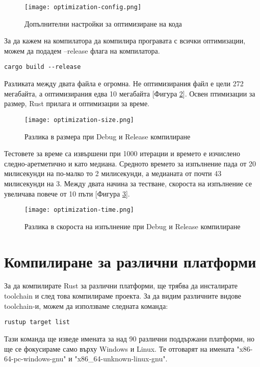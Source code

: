 \begin{figure}[!htb]
  \texttt{[image: optimization-config.png]}
  \centering
  \caption{Допълнителни настройки за оптимизиране на кода}
  \label{fig:optimization-config}
\end{figure}

За да кажем на компилатора да компилира програвата с всички оптимизации, можем
да подадем --release флага на компилатора.
\begin{lstlisting}
cargo build --release
\end{lstlisting}

Разликата между двата файла е огромна. Не оптимизирания файл е цели 272
мегабайта, а оптимизирания едва 10 мегабайта [Фигура
\ref{fig:optimization-size}]. Освен птимизации за размер, Rust прилага и
оптимизации за време. 

\begin{figure}[!htb]
  \texttt{[image: optimization-size.png]}
  \centering
  \caption{Разлика в размера при Debug и Release компилиране}
  \label{fig:optimization-size}
\end{figure}

Тестовете за време са извършени при 1000 итерации и времето е изчислено
следно-аретметично и като медиана. Средното времето за изпълнение пада от 20
милисекунди на по-малко то 2 милисекунди, а медианата от почти 43 милисекунди
на 3. Между двата начина за тестване, скороста на изпълнение се увеличава
повече от 10 пъти [Фигура \ref{fig:optimization-time}].

\begin{figure}[!htb]
  \texttt{[image: optimization-time.png]}
  \centering
  \caption{Разлика в скороста на изпълнение при Debug и Release компилиране}
  \label{fig:optimization-time}
\end{figure}


\section{Компилиране за различни платформи}
За да компилирате Rust за различни платформи, ще трябва да инсталирате
toolchain и след това компилираме проекта. За да видим различните видове
toolchain-и, можем да използваме следната команда:
\begin{lstlisting}
rustup target list
\end{lstlisting}
Тази команда ще изведе имената за над 90 различни поддържани платформи, но ще
се фокусираме само върху Windows и Linux. Те отговарят на имената
"x86-64-pc-windows-gnu" и "x86\_64-unknown-linux-gnu".

